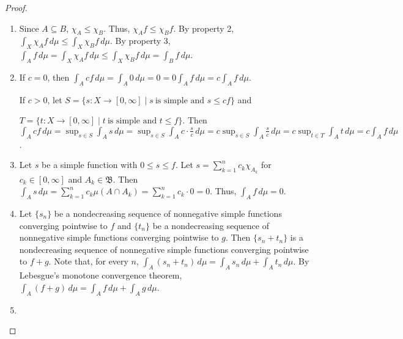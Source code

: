 \documentclass[12pt]{article}
\begin{document}
\begin{proof}
\begin{enumerate}
\item Since $A \subseteq B$, $\chi_A \le \chi_B$.  Thus, $\chi_Af \le \chi_Bf$.  By property 2, $\displaystyle \int_X \chi_Af \, d\mu \le \int_X \chi_Bf \, d\mu$.  By property 3, $\displaystyle \int_A f \, d\mu =\int_X \chi_Af \, d\mu \le \int_X \chi_Bf \, d\mu =\int_B f \, d\mu$.

\item If $c=0$, then $\displaystyle \int_A cf \, d\mu =\int_A 0 \, d\mu =0=0 \int_A f \, d\mu =c \int_A f \, d\mu$.

If $c>0$, let $S=\{s \colon X \to [0,\infty] \mid s~\text{is simple and }s \le cf\}$ and 

$T=\{t \colon X \to [0,\infty] \mid t~\text{is simple and }t \le f\}$.  Then $\displaystyle \int_A cf \, d\mu =\sup_{s \in S} \int_A s \, d\mu =\sup_{s \in S} \int_A c \cdot \frac{s}{c} \, d\mu =c\sup_{s \in S} \int_A \frac{s}{c} \, d\mu =c\sup_{t \in T} \int_A t \, d\mu =c \int_A f \, d\mu$.

\item Let $s$ be a simple function with $0 \le s \le f$.  Let $\displaystyle s=\sum_{k=1}^n c_k \chi_{A_k}$ for $c_k \in [0,\infty]$ and $A_k \in \mathfrak{B}$.  Then $\displaystyle \int_A s \, d\mu =\sum_{k=1}^n c_k \mu(A \cap A_k)=\sum_{k=1}^n c_k \cdot 0=0$.  Thus, $\displaystyle \int_A f \, d\mu=0$.

\item Let $\{s_n\}$ be a nondecreasing sequence of nonnegative simple functions converging pointwise to $f$ and $\{t_n\}$ be a nondecreasing sequence of nonnegative simple functions converging pointwise to $g$.  Then $\{s_n+t_n\}$ is a nondecreasing sequence of nonnegative simple functions converging pointwise to $f+g$.  Note that, for every $n$, $\displaystyle \int_A (s_n+t_n) \, d\mu =\int_A s_n \, d\mu +\int_A t_n \, d\mu$.  By Lebesgue's monotone convergence theorem, $\displaystyle \int_A (f+g) \, d\mu =\int_A f \, d\mu +\int_A g \, d\mu$.

\item

\vspace{1mm}


\end{enumerate}
\end{proof}
\end{document}
